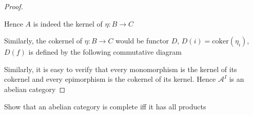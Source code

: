 \documentclass{article}
\newenvironment{exercise}[2][Exercise]{\begin{trivlist}
\item[\hskip \labelsep {\bfseries #1}\hskip \labelsep {\bfseries #2.}]}{\end{trivlist}}
\theoremstyle{definition}
\theoremstyle{remark}
\theoremstyle{definition}
\begin{document}
\begin{proof}
\begin{center}
\end{center}
Hence $A$ is indeed the kernel of $\eta:B\to C$ \par
Similarly, the cokernel of $\eta:B\to C$ would be functor $D$, $D(i)=\mathrm{coker}(\eta_i)$, $D(f)$ is defined by the following  commutative diagram
\begin{center}
\end{center}
Similarly, it is easy to verify that every monomorphism is the kernel of its cokernel and every epimorphism is the cokernel of its kernel. Hence $\mathcal A^I$ is an abelian category
\end{proof}

\begin{exercise}{\textbf{A5.1}}
Show that an abelian category is complete iff it has all products
\end{exercise}
\end{document}
